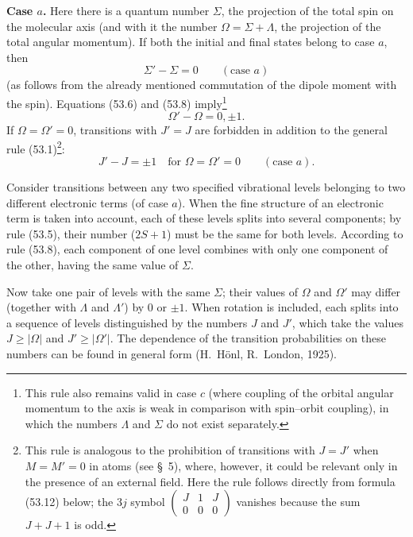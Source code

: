 \textbf{Case $a$.} Here there is a quantum number $\Sigma$, the projection of the total spin on the molecular axis (and with it the number $\Omega=\Sigma+\Lambda$, the projection of the total angular momentum). If both the initial and final states belong to case $a$, then
\begin{equation}
\Sigma'-\Sigma=0\qquad(\text{case }a)
\tag{53.8}
\end{equation}
(as follows from the already mentioned commutation of the dipole moment with the spin). Equations (53.6) and (53.8) imply\footnote{This rule also remains valid in case $c$ (where coupling of the orbital angular momentum to the axis is weak in comparison with spin--orbit coupling), in which the numbers $\Lambda$ and $\Sigma$ do not exist separately.}
\begin{equation}
\Omega'-\Omega=0,\pm1.
\tag{53.9}
\end{equation}
If $\Omega=\Omega'=0$, transitions with $J'=J$ are forbidden in addition to the general rule (53.1)\footnote{This rule is analogous to the prohibition of transitions with $J=J'$ when $M=M'=0$ in atoms (see \S~5), where, however, it could be relevant only in the presence of an external field. Here the rule follows directly from formula (53.12) below; the $3j$ symbol $\begin{pmatrix}J&1&J\\0&0&0\end{pmatrix}$ vanishes because the sum $J+J+1$ is odd.}:
\begin{equation}
J'-J=\pm1\quad\text{for }\Omega=\Omega'=0\qquad(\text{case }a).
\tag{53.10}
\end{equation}

Consider transitions between any two specified vibrational levels belonging to two different electronic terms (of case $a$). When the fine structure of an electronic term is taken into account, each of these levels splits into several components; by rule (53.5), their number ($2S+1$) must be the same for both levels. According to rule (53.8), each component of one level combines with only one component of the other, having the same value of $\Sigma$.

Now take one pair of levels with the same $\Sigma$; their values of $\Omega$ and $\Omega'$ may differ (together with $\Lambda$ and $\Lambda'$) by 0 or $\pm1$. When rotation is included, each splits into a sequence of levels distinguished by the numbers $J$ and $J'$, which take the values $J\geq|\Omega|$ and $J'\geq|\Omega'|$. The dependence of the transition probabilities on these numbers can be found in general form (H.~Hönl, R.~London, 1925).

